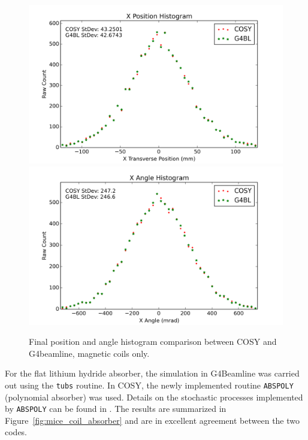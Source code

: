 \documentclass{jacow}
\begin{document}
\begin{figure}[!h]
\centering
\includegraphics[width=\columnwidth]{Figures/coil tests/xposition.png}
\includegraphics[width=\columnwidth]{Figures/coil tests/xangle.png}
\caption{Final position and angle histogram comparison between COSY and G4beamline, magnetic coils only.}
\label{fig:mice_coil_histograms}
\end{figure}

For the flat lithium hydride absorber, the simulation in G4Beamline was carried out using the \texttt{tubs} routine. In COSY, the newly implemented routine \texttt{ABSPOLY} (polynomial absorber) was used. Details on the stochastic processes implemented by \texttt{ABSPOLY} can be found in \cite{ipac2015}. The results are summarized in Figure~\ref{fig:mice_coil_absorber} and are in excellent agreement between the two codes.
\end{document}

